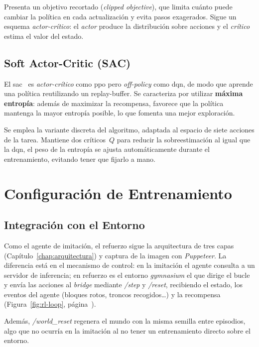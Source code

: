 Presenta un objetivo recortado (\textit{clipped objective}), que
limita cuánto puede cambiar la \gls{política} en cada actualización y evita pasos exagerados.
Sigue un esquema \textit{actor-crítico}: el \textit{actor} produce la distribución sobre
acciones y el \textit{crítico} estima el valor del estado.

\subsection{Soft Actor-Critic (SAC)}
\label{sec:rl-sac}
El \gls{sac}~\cite{DBLP:journals/corr/abs-1801-01290} es \textit{actor-crítico} como \gls{ppo} 
pero \textit{\gls{off-policy}} como \gls{dqn}, de modo que aprende una \gls{política} 
reutilizando un \gls{replay-buffer}.
Se caracteriza por utilizar \textbf{máxima entropía}: además de maximizar la
recompensa, favorece que la \gls{política} mantenga la mayor entropía posible, lo que fomenta
una mejor exploración.

Se emplea la variante discreta del algoritmo, adaptada al espacio de siete
acciones de la tarea. Mantiene dos críticos~$Q$ para reducir la
sobreestimación al igual que la \gls{dqn}, el peso de la entropía se ajusta automáticamente
durante el entrenamiento, evitando tener que fijarlo a mano.

\section{Configuración de Entrenamiento}
\label{sec:rl-config}

\subsection{Integración con el Entorno}
Como el agente de imitación, el refuerzo sigue la arquitectura de tres capas
(Capítulo~\ref{chap:arquitectura}) y captura de la imagen con \textit{Puppeteer}. La diferencia
está en el mecanismo de control: en la imitación el agente consulta a un servidor
de inferencia; en refuerzo es el
entorno \textit{\gls{gymnasium}} el que dirige el bucle y envía las acciones al \textit{bridge}
mediante \textit{/step} y \textit{/reset}, recibiendo el estado, los eventos del agente
(bloques rotos, troncos recogidos\dots) y la recompensa (Figura~\ref{fig:rl-loop}, página~\pageref{fig:rl-loop}).

Además, \textit{/world\_reset} regenera el mundo con la misma \gls{semilla} entre
episodios, algo que no ocurría en la imitación al no tener un entrenamiento directo sobre el entorno.

